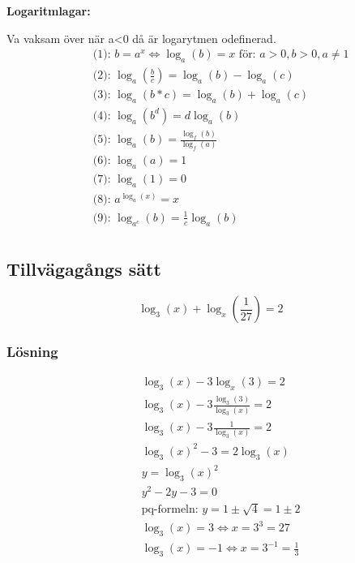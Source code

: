 \textbf{Logaritmlagar:}\par
Va vaksam över när a<0 då är logarytmen odefinerad. 
\begin{align*}
  &\quad \text{(1): } b = a^x \Leftrightarrow \log_a(b) = x  \text{ för: } a>0, b>0, a \ne 1  \\
  &\quad \text{(2): } \log_a(\frac{b}{c}) = \log_a(b) - \log_a(c) \\
  &\quad \text{(3): } \log_a(b*c) = \log_a(b) + \log_a(c) \\
  &\quad \text{(4): } \log_a(b^d) = d\log_a(b) \\
  &\quad \text{(5): } \log_a(b) = \frac{\log_f(b)}{\log_f(a)} \\
  &\quad \text{(6): } \log_a(a) = 1 \\
  &\quad \text{(7): } \log_a(1) = 0 \\
  &\quad \text{(8): } a^{\log_a(x)} = x \\
  &\quad \text{(9): } \log_{a^c}(b) = \frac{1}{c} \log_a(b) \\
\end{align*}

\subsection{Tillvägagångs sätt}
\begin{equation}
\log_3(x) + \log_x(\frac{1}{27}) = 2
\end{equation}

\subsubsection{Lösning}
\begin{align*}
  &\quad \log_3(x) - 3 \log_x(3) = 2 \\
  &\quad  \log_3(x) - 3 \frac{\log_3(3)}{\log_3(x)} = 2 \\
  &\quad  \log_3(x) - 3 \frac{1}{\log_3(x)} = 2 \\
  &\quad  \log_3(x)^2 - 3 = 2 \log_3(x) \\
  &\quad  y = \log_3(x)^{2} \\
  &\quad  y^2 - 2y- 3 = 0 \\
  &\quad  \text{pq-formeln: } y= 1 \pm \sqrt{4} = 1 \pm 2 \\
  &\quad  \log_3(x) = 3 \Leftrightarrow x = 3^3 = 27 \\
  &\quad  \log_3(x) = -1 \Leftrightarrow x = 3^{-1} = \frac{1}{3} \\
\end{align*}


